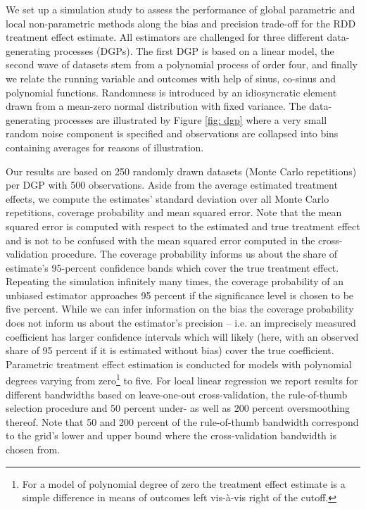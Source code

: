 
We set up a simulation study to assess the performance of global parametric and local non-parametric methods along the bias and precision trade-off for the RDD treatment effect estimate. All estimators are challenged for three different data-generating processes (DGPs). The first DGP is based on a linear model, the second wave of datasets stem from a polynomial process of order four, and finally we relate the running variable and outcomes with help of sinus, co-sinus and polynomial functions. Randomness is introduced by an idiosyncratic element drawn from a mean-zero normal distribution with fixed variance. The data-generating processes are illustrated by Figure \ref{fig: dgp} where a very small random noise component is specified and observations are collapsed into bins containing averages for reasons of illustration.

Our results are based on 250 randomly drawn datasets (Monte Carlo repetitions) per DGP with 500 observations. Aside from the average estimated treatment effects, we compute the estimates' standard deviation over all Monte Carlo repetitions, coverage probability and mean squared error. Note that the mean squared error is computed with respect to the estimated and true treatment effect and is not to be confused with the mean squared error computed in the cross-validation procedure. The coverage probability informs us about the share of estimate's 95-percent confidence bands which cover the true treatment effect. Repeating the simulation infinitely many times, the coverage probability of an unbiased estimator approaches 95 percent if the significance level is chosen to be five percent. While we can infer information on the bias the coverage probability does not inform us about the estimator's precision -- i.e. an imprecisely measured coefficient has larger confidence intervals which will likely (here, with an observed share of 95 percent if it is estimated without bias) cover the true coefficient. Parametric treatment effect estimation is conducted for models with polynomial degrees varying from zero\footnote{For a model of polynomial degree of zero the treatment effect estimate is a simple difference in means of outcomes left vis-à-vis right of the cutoff.} to five. For local linear regression we report results for different bandwidths based on leave-one-out cross-validation, the rule-of-thumb selection procedure and 50 percent under- as well as 200 percent oversmoothing thereof. Note that 50 and 200 percent of the rule-of-thumb bandwidth correspond to the grid's lower and upper bound where the cross-validation bandwidth is chosen from.

